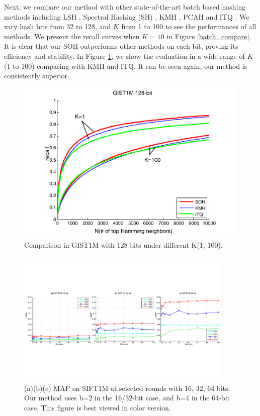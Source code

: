 \documentclass{article}
\begin{document}
Next, we compare our method with other state-of-the-art batch based hashing methods including LSH \cite{gionis1999similarity}, Spectral Hashing (SH) \cite{weiss2009spectral}, KMH \cite{he2013k}, PCAH and ITQ \cite{gong2013iterative}.  We vary hash bits from 32 to 128, and $K$ from 1 to 100 to see the performances of all methods. We present the recall curves when $K=10$ in Figure \ref{batch_compare}. It is clear that our SOH  outperforms other methods on  each bit, proving its efficiency and stability. In Figure \ref{fig_k}, we show the evaluation in a wide range of $K$ (1 to 100) comparing with KMH and ITQ. It can be seen again, our method is consistently superior.
\begin{figure}[htb]
	\begin{center}
		\includegraphics[width=0.76\columnwidth]{K_p}
		\caption{Comparison in GIST1M with 128 bits under different K(1, 100).}
		\label{fig_k}
	\end{center}
\end{figure}
\begin{figure}[ht]
	\begin{center}
		\includegraphics[width=0.92\textwidth]{onlinerst_p}
		\caption{(a)(b)(c) MAP on SIFT1M at selected rounds with 16, 32, 64 bits. Our method uses b=2 in the 16/32-bit case, and b=4 in the 64-bit case. This figure is best viewed in color version. }
		\label{compare_online}
	\end{center}
\end{figure}
\end{document}
